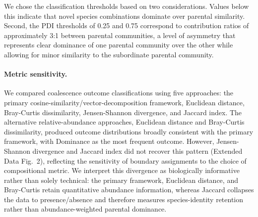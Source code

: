 We chose the classification thresholds based on two considerations.  Values below this indicate that novel species combinations dominate over parental similarity. Second, the PDI thresholds of 0.25 and 0.75 correspond to contribution ratios of approximately 3:1 between parental communities, a level of asymmetry that represents clear dominance of one parental community over the other while allowing for minor similarity to the subordinate parental community.


\paragraph{Metric sensitivity.}
We compared coalescence outcome classifications using five approaches: the primary cosine-similarity/vector-decomposition framework, Euclidean distance, Bray-Curtis dissimilarity, Jensen-Shannon divergence, and Jaccard index. The alternative relative-abundance approaches, Euclidean distance and Bray-Curtis dissimilarity, produced outcome distributions broadly consistent with the primary framework, with Dominance as the most frequent outcome. However, Jensen-Shannon divergence and Jaccard index did not recover this pattern (Extended Data Fig.~2), reflecting the sensitivity of boundary assignments to the choice of compositional metric. We interpret this divergence as biologically informative rather than solely technical: the primary framework, Euclidean distance, and Bray-Curtis retain quantitative abundance information, whereas Jaccard collapses the data to presence/absence and therefore measures species-identity retention rather than abundance-weighted parental dominance.


